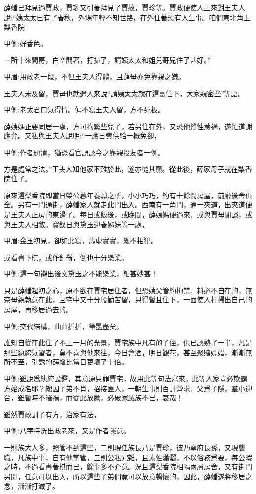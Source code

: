 \begin{parag}
    薛蟠已拜見過賈政，賈璉又引著拜見了賈赦，賈珍等。賈政便使人上來對王夫人說:“姨太太已有了春秋，外甥年輕不知世路，在外住著恐有人生事。咱們東北角上梨香院\begin{note}甲側:好香色。\end{note}一所十來間房，白空閒著，打掃了，請姨太太和姐兒哥兒住了甚好。”\begin{note}甲眉:用政老一段，不但王夫人得體，且薛母亦免靠親之嫌。\end{note}王夫人未及留，賈母也就遣人來說“請姨太太就在這裏住下，大家親密些”等語。\begin{note}甲側:老太君口氣得情。偏不寫王夫人留，方不死板。\end{note}薛姨媽正要同居一處，方可拘緊些兒子，若另住在外，又恐他縱性惹禍，遂忙道謝應允。又私與王夫人說明:“一應日費供給一概免卻，\begin{note}甲側:作者題清，猶恐看官誤認今之靠親投友者一例。\end{note}方是處常之法。”王夫人知他家不難於此，遂亦從其願。從此後，薛家母子就在梨香院住了。
\end{parag}


\begin{parag}
    原來這梨香院即當日榮公暮年養靜之所，小小巧巧，約有十餘間房屋，前廳後舍俱全。另有一門通街，薛蟠家人就走此門出入。西南有一角門，通一夾道，出夾道便是王夫人正房的東邊了。每日或飯後，或晚間，薛姨媽便過來，或與賈母閒談，或與王夫人相敘。寶釵日與黛玉迎春姊妹等一處，\begin{note}甲眉:金玉初見，卻如此寫，虛虛實實，總不相犯。\end{note}或看書下棋，或作針黹，倒也十分樂業。\begin{note}甲側:這一句襯出後文黛玉之不能樂業，細甚妙甚！\end{note}只是薛蟠起初之心，原不欲在賈宅居住者，但恐姨父管約拘禁，料必不自在的，無奈母親執意在此，且宅中又十分殷勤苦留，只得暫且住下，一面使人打掃出自己的房屋，再移居過去的。\begin{note}甲側:交代結構，曲曲折折，筆墨盡矣。\end{note}誰知自從在此住了不上一月的光景，賈宅族中凡有的子侄，俱已認熟了一半，凡是那些紈絝氣習者，莫不喜與他來往，今日會酒，明日觀花，甚至聚賭嫖娼，漸漸無所不至，引誘的薛蟠比當日更壞了十倍。\begin{note}甲側:雖說爲紈絝設鑑，其意原只罪賈宅，故用此等句法寫來。此等人家豈必欺霸方始成名耶？總因子弟不肖，招接匪人，一朝生事則百計營求，父爲子隱，羣小迎合，雖暫時不罹禍，而從此放膽，必破家滅族不已，哀哉！\end{note}雖然賈政訓子有方，治家有法，\begin{note}甲側:八字特洗出政老來，又是作者隱意。\end{note}一則族大人多，照管不到這些，二則現任族長乃是賈珍，彼乃寧府長孫，又現襲職，凡族中事，自有他掌管，三則公私冗雜，且素性瀟灑，不以俗務爲要，每公暇之時，不過看書著棋而已，餘事多不介意。況且這梨香院相隔兩層房舍，又有街門另開，任意可以出入，所以這些子弟們竟可以放意暢懷的，因此，薛蟠遂將移居之念，漸漸打滅了。
\end{parag}


